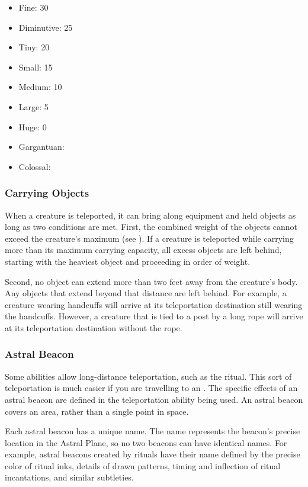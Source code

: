       \begin{itemize}
        \item Fine: 30
        \item Diminutive: 25
        \item Tiny: 20
        \item Small: 15
        \item Medium: 10
        \item Large: 5
        \item Huge: 0
        \item Gargantuan: 
        \item Colossal: 
      \end{itemize}

    \subsubsection{Carrying Objects}
      When a creature is teleported, it can bring along equipment and held objects as long as two conditions are met.
      First, the combined weight of the objects cannot exceed the creature's maximum  (see ).
      If a creature is teleported while carrying more than its maximum carrying capacity, all excess objects are left behind, starting with the heaviest object and proceeding in order of weight.

      Second, no object can extend more than two feet away from the creature's body.
      Any objects that extend beyond that distance are left behind.
      For example, a creature wearing handcuffs will arrive at its teleportation destination still wearing the handcuffs.
      However, a creature that is tied to a post by a long rope will arrive at its teleportation destination without the rope.

    \subsubsection{Astral Beacon}\label{Astral Beacon}
      Some abilities allow long-distance teleportation, such as the  ritual.
      This sort of teleportation is much easier if you are travelling to an .
      The specific effects of an astral beacon are defined in the teleportation ability being used.
      An astral beacon covers an area, rather than a single point in space.

      Each astral beacon has a unique name.
      The name represents the beacon's precise location in the Astral Plane, so no two beacons can have identical names.
      For example, astral beacons created by rituals have their name defined by the precise color of ritual inks, details of drawn patterns, timing and inflection of ritual incantations, and similar subtleties.

